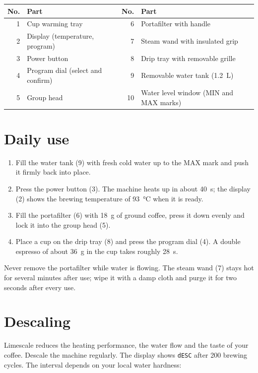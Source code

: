 \documentclass[10pt,a4paper]{article}
\begin{document}
\begin{tabularx}{\linewidth}{@{}r X r X@{}}
  \toprule
  \textbf{No.} & \textbf{Part} & \textbf{No.} & \textbf{Part} \\
  \midrule
  1 & Cup warming tray & 6 & Portafilter with handle \\
  2 & Display (temperature, program) & 7 & Steam wand with insulated grip \\
  3 & Power button & 8 & Drip tray with removable grille \\
  4 & Program dial (select and confirm) & 9 & Removable water tank (\qty{1.2}{L}) \\
  5 & Group head & 10 & Water level window (MIN and MAX marks) \\
  \bottomrule
\end{tabularx}

\section{Daily use}
\begin{enumerate}[leftmargin=1.6em, itemsep=0.1em]
  \item Fill the water tank (9) with fresh cold water up to the MAX mark and push it firmly back into place.
  \item Press the power button (3). The machine heats up in about \qty{40}{s}; the display (2) shows the
        brewing temperature of \qty{93}{\celsius} when it is ready.
  \item Fill the portafilter (6) with \qty{18}{g} of ground coffee, press it down evenly and lock it into the
        group head (5).
  \item Place a cup on the drip tray (8) and press the program dial (4). A double espresso of about
        \qty{36}{g} in the cup takes roughly \qty{28}{s}.
\end{enumerate}

\begin{cautionbox}
Never remove the portafilter while water is flowing. The steam wand (7) stays hot for several minutes after
use; wipe it with a damp cloth and purge it for two seconds after every use.
\end{cautionbox}

\section{Descaling}
Limescale reduces the heating performance, the water flow and the taste of your coffee. Descale the machine
regularly. The display shows \texttt{dESC} after 200 brewing cycles. The interval depends on your local water
hardness:
\end{document}
